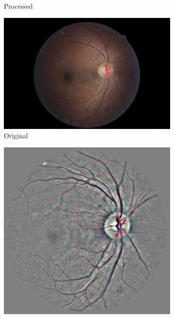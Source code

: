 \begin{figure}[tb]
\begin{subfigure}[b]{0.24\textwidth}
        \caption{Processed}
    \end{subfigure}
    \hfill
    \begin{subfigure}[b]{0.24\textwidth}
        \centering
        \includegraphics[width=\textwidth, height=\textwidth]{figures/chapter4/Preprocessing/Ori/352_right.jpeg}
        \caption{Original}
    \end{subfigure}
    \hfill
    \begin{subfigure}[b]{0.24\textwidth}
        \centering
        \includegraphics[width=\textwidth, height=\textwidth]{figures/chapter4/Preprocessing/Prep/352_right.jpeg}

\end{subfigure}
\end{figure}
